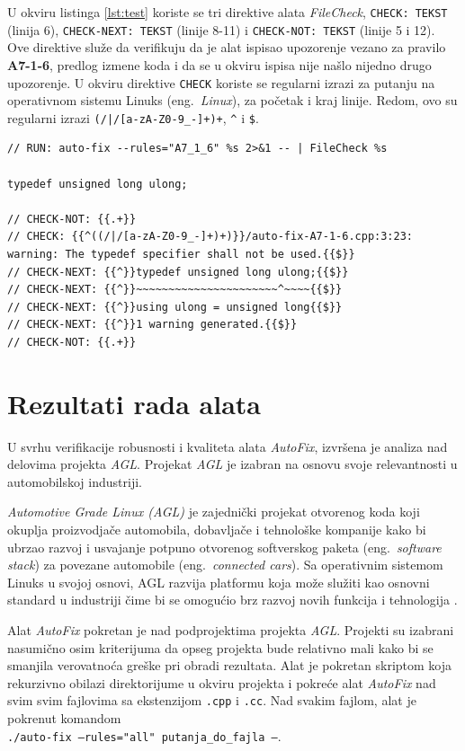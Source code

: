 \documentclass[12pt,oneside]{memoir}
\begin{document}
 U okviru listinga \ref{lst:test} koriste se tri direktive alata \textit{FileCheck}, \texttt{CHECK: TEKST} (linija 6), \texttt{CHECK-NEXT: TEKST} (linije 8-11) i \texttt{CHECK-NOT: TEKST} (linije 5 i 12). Ove direktive slu\v{z}e da verifikuju da je alat ispisao upozorenje vezano za pravilo \textbf{A7-1-6}, predlog izmene koda i da se u okviru ispisa nije na\v{s}lo nijedno drugo upozorenje. U okviru direktive \texttt{CHECK} koriste se regularni izrazi za putanju na operativnom sistemu Linuks (eng.~\textit{Linux}), za po\v{c}etak i kraj linije. Redom, ovo su regularni izrazi \lstinline[style=custombash]{(/|/[a-zA-Z0-9_-]+)+}, \lstinline[style=custombash]{^} i \lstinline[style=custombash]{$}. 


\begin{lstlisting}[style=customc, caption={Pojednostavljeni primer testa za pravilo \textbf{A7-1-6} u okviru alata \textit{AutoFix}.},label={lst:test}]
// RUN: auto-fix --rules="A7_1_6" %s 2>&1 -- | FileCheck %s

typedef unsigned long ulong;

// CHECK-NOT: {{.+}}
// CHECK: {{^((/|/[a-zA-Z0-9_-]+)+)}}/auto-fix-A7-1-6.cpp:3:23: warning: The typedef specifier shall not be used.{{$}}
// CHECK-NEXT: {{^}}typedef unsigned long ulong;{{$}}
// CHECK-NEXT: {{^}}~~~~~~~~~~~~~~~~~~~~~~^~~~~{{$}}
// CHECK-NEXT: {{^}}using ulong = unsigned long{{$}}
// CHECK-NEXT: {{^}}1 warning generated.{{$}}
// CHECK-NOT: {{.+}}
\end{lstlisting}

\section{Rezultati rada alata}

U svrhu verifikacije robusnosti i kvaliteta alata \textit{AutoFix}, izvr\v{s}ena je analiza nad delovima projekta \textit{AGL}. Projekat \textit{AGL}
je izabran na osnovu svoje relevantnosti u automobilskoj industriji. \par

\textit{Automotive Grade Linux (AGL)} je zajedni\v{c}ki projekat otvorenog koda koji okuplja proizvodja\v{c}e automobila, dobavlja\v{c}e i tehnolo\v{s}ke kompanije kako bi ubrzao razvoj i usvajanje potpuno otvorenog softverskog paketa (eng.~\textit{software stack}) za povezane automobile (eng.~\textit{connected cars}). Sa operativnim sistemom Linuks u svojoj osnovi, AGL razvija platformu koja mo\v{z}e slu\v{z}iti kao osnovni standard u industriji \v{c}ime bi se omogu\'{c}io brz razvoj novih funkcija i tehnologija \cite{AGL}.
\par
Alat \textit{AutoFix} pokretan je nad podprojektima projekta \textit{AGL}. Projekti su izabrani nasumi\v{c}no osim kriterijuma
da opseg projekta bude relativno mali kako bi se smanjila verovatno\'{c}a gre\v{s}ke pri obradi rezultata. Alat je pokretan skriptom koja rekurzivno 
obilazi direktorijume u okviru projekta i pokre\'{c}e alat \textit{AutoFix} nad  svim
svim fajlovima sa ekstenzijom \texttt{.cpp} i \texttt{.cc}. Nad svakim fajlom, alat je pokrenut komandom \\
\texttt{./auto-fix  --rules="all"  putanja\_do\_fajla  --}.
\end{document}
